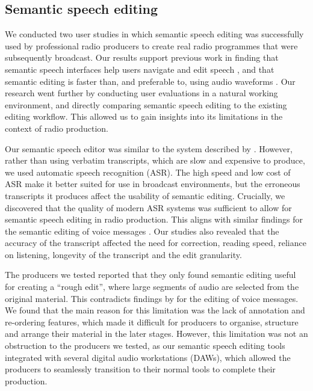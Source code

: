 \subsection{Semantic speech editing}

We conducted two user studies in which semantic speech editing was successfully used by professional radio producers to
create real radio programmes that were subsequently broadcast. Our results support previous work in finding that
semantic speech interfaces help users navigate and edit speech \citep{Whittaker2002}, and that semantic editing is
faster than, and preferable to, using audio waveforms \citep{Whittaker2004,Sivaraman2016}. Our research went further by
conducting user evaluations in a natural working environment, and directly comparing semantic speech editing to the
existing editing workflow. This allowed us to gain insights into its limitations in the context of radio production.

Our semantic speech editor was similar to the system described by \citet{Rubin2013}. However, rather than using
verbatim transcripts, which are slow and expensive to produce, we used automatic speech recognition (ASR). The high
speed and low cost of ASR make it better suited for use in broadcast environments, but the erroneous transcripts it
produces affect the usability of semantic editing.  Crucially, we discovered that the quality of modern ASR systems was
sufficient to allow for semantic speech editing in radio production.  This aligns with similar findings for the
semantic editing of voice messages \citep{Whittaker2004,Sivaraman2016}.  Our studies also revealed that the accuracy of
the transcript affected the need for correction, reading speed, reliance on listening, longevity of the transcript and
the edit granularity.

The producers we tested reported that they only found semantic editing useful for creating a ``rough edit'', where
large segments of audio are selected from the original material. This contradicts findings by \citet{Sivaraman2016} for
the editing of voice messages.
We found that the main reason for this limitation was the lack of annotation and re-ordering features, which made it
difficult for producers to organise, structure and arrange their material in the later stages.  However, this
limitation was not an obstruction to the producers we tested, as our semantic speech editing tools integrated with
several digital audio workstations (DAWs), which allowed the producers to seamlessly transition to their normal tools
to complete their production.



